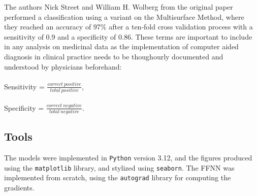 The authors Nick Street and William H. Wolberg from the original paper performed a classification using a variant on the Multisurface 
Method, where they reached an accuracy of 97$\%$ after a ten-fold cross validation process with a sensitivity of 0.9 and a specificity of 0.86. 
These terms are important to include in any analysis on medicinal data as the implementation of computer aided diagnosis in clinical practice 
needs to be thoughourly documented and understood by physicians beforehand: 
\\
\\
Sensitivity = $\frac{correct\ positive}{total\ positive}$,
\\
\\
Specificity = $\frac{correct\ negative}{total\ negative}$.
%
\subsection{Tools}\label{ssec:tools}
The models were implemented in \verb|Python| version 3.12, and the figures produced using the \verb|matplotlib| library, 
and stylized using \verb|seaborn|. The FFNN was implemented from scratch, using the \verb|autograd| library \cite{maclaurin2015:autograd} 
for computing the gradients.